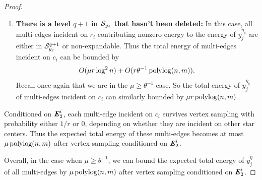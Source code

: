 \documentclass{article}
\begin{document}
\begin{proof}
{\begin{enumerate}
        Note that
        $$\mu \geq |\Scal_{y_j}|/\log^2 n \geq |\Scal_{y_j}^{q}|/\log^2 n \geq 16^{q} / \log^2n,$$
        where the first inequality follows from Step \ref{step:discard},
        and the last inequality follows since level $q$ is the last level that hasn't
        been deleted.
        Also, recall that we are in the $\mu \geq \theta^{-1}$ case.
        So the total energy of $y_j^{\eta_q}$ of multi-edges incident on $c_i$
        is less than or equal to
        $\mu r \polylog(n,m)$.

        \item \textbf{There is a level $q+1$ in $\mathcal{S}_{y_j}$ that hasn't been deleted:}
        In this case, all multi-edges
        incident on $c_i$
        contributing nonzero energy to the energy of $y_j^{\eta_q}$
        are either in $\mathcal{S}_{y_j}^{q+1}$ or non-expandable. Thus the total energy of multi-edges
        incident on $c_i$ can be bounded by
        \begin{align}\label{eq:contri2}
        O(\mu r \log^2 n) +
        O(r \theta^{-1} \operatorname{polylog}(n,m)).
        \end{align}
        Recall once again that we are in the $\mu \geq \theta^{-1}$ case.
        So the total energy of $y_j^{\eta_q}$
        of multi-edges incident on $c_i$ can similarly bounded
        by $\mu r \polylog(n,m)$.
        \end{enumerate}
    }
    Conditioned on $\boldsymbol{\mathit{E}}_2^i$, each multi-edge incident on $c_i$ survives vertex sampling
    with probability either $1/r$ or $0$, depending
    on whether they are incident on other star centers.
    Thus the expected total energy of these multi-edges becomes
    at most $\mu \operatorname{polylog}(n,m)$ after vertex sampling
    conditioned on $\boldsymbol{\mathit{E}}_2^i$.

    Overall, in the case when $\mu \geq \theta^{-1}$,
    we can bound the expected total energy of $y_j^{\eta}$ of all multi-edges
    by $\mu \operatorname{polylog}(n,m)$
    after vertex sampling conditioned on $\boldsymbol{\mathit{E}}_2^i$.


\end{proof}
\end{document}
